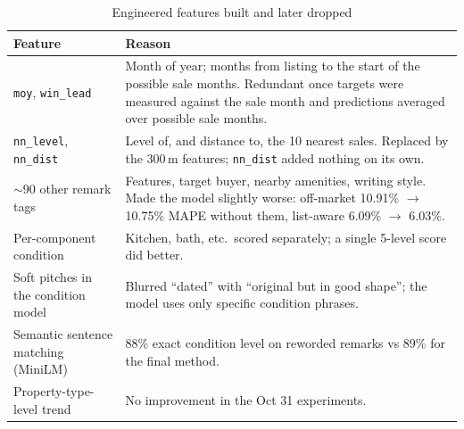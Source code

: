 \begin{table}[ht]
\centering
\small
\caption{Engineered features built and later dropped}
\label{tab:features-dropped}
\begin{tabularx}{\textwidth}{p{4.2cm}X}
\hline
Feature & Reason \\
\hline
\texttt{moy}, \texttt{win\_lead} & Month of year; months from listing to the start of the possible sale months. Redundant once targets were measured against the sale month and predictions averaged over possible sale months. \\
\texttt{nn\_level}, \texttt{nn\_dist} & Level of, and distance to, the 10 nearest sales. Replaced by the 300\,m features; \texttt{nn\_dist} added nothing on its own. \\
$\sim$90 other remark tags & Features, target buyer, nearby amenities, writing style. Made the model slightly worse: off-market 10.91\% $\to$ 10.75\% MAPE without them, list-aware 6.09\% $\to$ 6.03\%. \\
Per-component condition & Kitchen, bath, etc.\ scored separately; a single 5-level score did better. \\
Soft pitches in the condition model & Blurred ``dated'' with ``original but in good shape''; the model uses only specific condition phrases. \\
Semantic sentence matching (MiniLM) & 88\% exact condition level on reworded remarks vs 89\% for the final method. \\
Property-type-level trend & No improvement in the Oct 31 experiments. \\
\hline
\end{tabularx}
\end{table}

